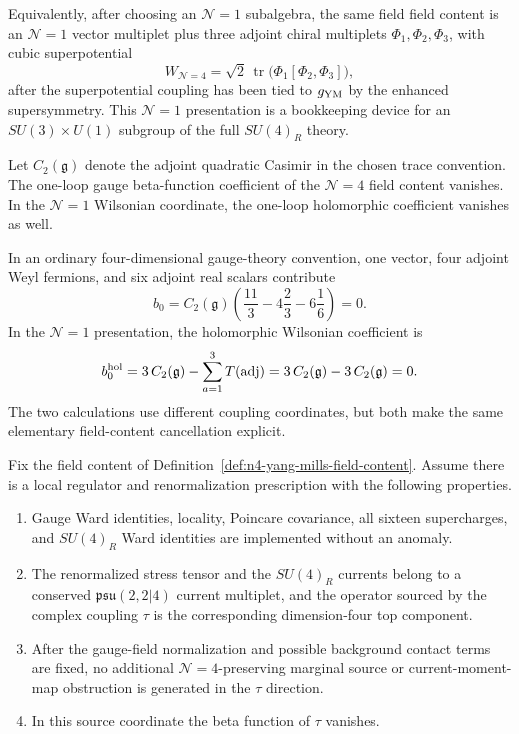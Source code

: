 Equivalently, after choosing an \(\mathcal N=1\) subalgebra, the same field
field content is an \(\mathcal N=1\) vector multiplet plus three adjoint chiral
multiplets \(\Phi_1,\Phi_2,\Phi_3\), with cubic superpotential
\[
  W_{\mathcal N=4}
  =
  \sqrt2\,\operatorname{tr}\bigl(\Phi_1[\Phi_2,\Phi_3]\bigr),
\]
after the superpotential coupling has been tied to \(g_{\rm YM}\) by the
enhanced supersymmetry.  This \(\mathcal N=1\) presentation is a bookkeeping
device for an \(SU(3)\times U(1)\) subgroup of the full \(SU(4)_R\) theory.

\begin{remark}
\label{rem:n4-beta-one-loop-cancellation}
Let \(C_2(\mathfrak g)\) denote the adjoint quadratic Casimir in the chosen
trace convention.  The one-loop gauge beta-function coefficient of the
\(\mathcal N=4\) field content vanishes.  In the \(\mathcal N=1\) Wilsonian
coordinate, the one-loop holomorphic coefficient vanishes as well.

In an ordinary four-dimensional gauge-theory convention, one vector, four
adjoint Weyl fermions, and six adjoint real scalars contribute
\[
  b_0
  =
  C_2(\mathfrak g)
  \left(
  \frac{11}{3}
  -4\frac{2}{3}
  -6\frac{1}{6}
  \right)
  =
  0 .
\]
In the \(\mathcal N=1\) presentation, the holomorphic Wilsonian coefficient
is
\[
  b_0^{\rm hol}
  =
  3\,C_2(\mathfrak g)-\sum_{a=1}^3 T({\rm adj})
  =
  3\,C_2(\mathfrak g)-3\,C_2(\mathfrak g)
  =
  0 .
\]
The two calculations use different coupling coordinates, but both make the
same elementary field-content cancellation explicit.
\end{remark}

\begin{hypothesis}[Finite \(\mathcal N=4\) conformal-family input]
\label{hyp:n4-finite-conformal-family}
Fix the field content of Definition~\ref{def:n4-yang-mills-field-content}.  Assume
there is a local regulator and renormalization prescription with the following
properties.
\begin{enumerate}
\item Gauge Ward identities, locality, Poincare covariance, all sixteen
  supercharges, and \(SU(4)_R\) Ward identities are implemented without an
  anomaly.
\item The renormalized stress tensor and the \(SU(4)_R\) currents belong to a
  conserved \(\mathfrak{psu}(2,2|4)\) current multiplet, and the operator
  sourced by the complex coupling \(\tau\) is the corresponding
  dimension-four top component.
\item After the gauge-field normalization and possible background contact
  terms are fixed, no additional \(\mathcal N=4\)-preserving marginal source
  or current-moment-map obstruction is generated in the \(\tau\) direction.
\item In this source coordinate the beta function of \(\tau\) vanishes.
\end{enumerate}
\end{hypothesis}

